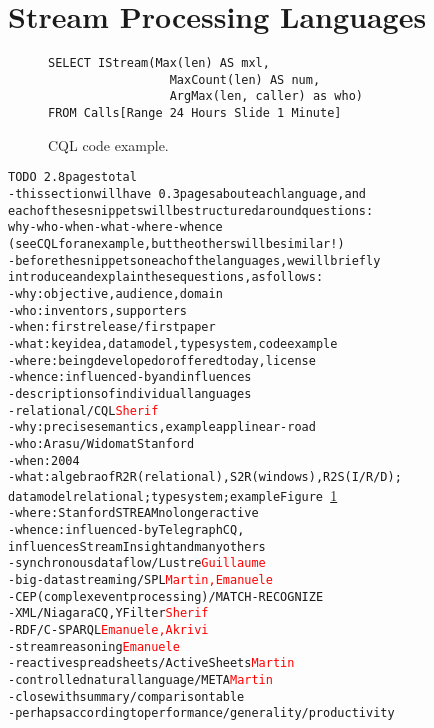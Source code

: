 \section{Stream Processing Languages}\label{sec:languages}

\begin{figure}
\begin{lstlisting}
SELECT IStream(Max(len) AS mxl,
                 MaxCount(len) AS num,
                 ArgMax(len, caller) as who)
FROM Calls[Range 24 Hours Slide 1 Minute]
\end{lstlisting}
\vspace*{-4mm}
\caption{\label{fig:cql}CQL code example.}
\end{figure}

\begin{alltt}TODO\scriptsize ~2.8 pages total
- this section will have ~0.3 pages about each language, and
  each of these snippets will be structured around questions:
  why-who-when-what-where-whence
  (see CQL for an example, but the others will be similar!)
- before the snippets on each of the languages, we will briefly
  introduce and explain these questions, as follows:
  - why: objective, audience, domain
  - who: inventors, supporters
  - when: first release / first paper
  - what: key idea, data model, type system, code example
  - where: being developed or offered today, license
  - whence: influenced-by and influences
- descriptions of individual languages
  - relational / CQL \cite{arasu_babu_widom_2006}   \textcolor{red}{Sherif}
    - why: precise semantics \cite{arasu_widom_2004}, example app linear-road \cite{arasu_et_al_2004}
    - who: Arasu/Widom at Stanford
    - when: 2004
    - what: algebra of R2R (relational), S2R (windows), R2S (I/R/D);
      data model relational; type system \cite{soule_et_al_2016}; example Figure~\ref{fig:cql}
    - where: Stanford STREAM no longer active
    - whence: influenced-by TelegraphCQ \cite{chandrasekaran_et_al_2003},
      influences StreamInsight \cite{ali_et_al_2009} and many others
  - synchronous dataflow / Lustre \cite{caspi_et_al_1987} \textcolor{red}{Guillaume}
  - big-data streaming / SPL \cite{hirzel_schneider_gedik_2017} \textcolor{red}{Martin, Emanuele}
  - CEP (complex event processing) / MATCH-RECOGNIZE \cite{zemke_et_al_2007} \cite{hirzel_2012}
  - XML / NiagaraCQ \cite{chen_et_al_2000}, YFilter \cite{diao_et_al_2002} \textcolor{red}{Sherif}
  - RDF / C-SPARQL \cite{barbieri_et_al_2009} \textcolor{red}{Emanuele, Akrivi}
  - stream reasoning \textcolor{red}{Emanuele}
  - reactive spreadsheets / ActiveSheets \cite{vaziri_et_al_2014} \textcolor{red}{Martin}
  - controlled natural language / META \cite{arnold_et_al_2016} \textcolor{red}{Martin}
- close with summary/comparison table
  - perhaps according to performance/generality/productivity
\end{alltt}

